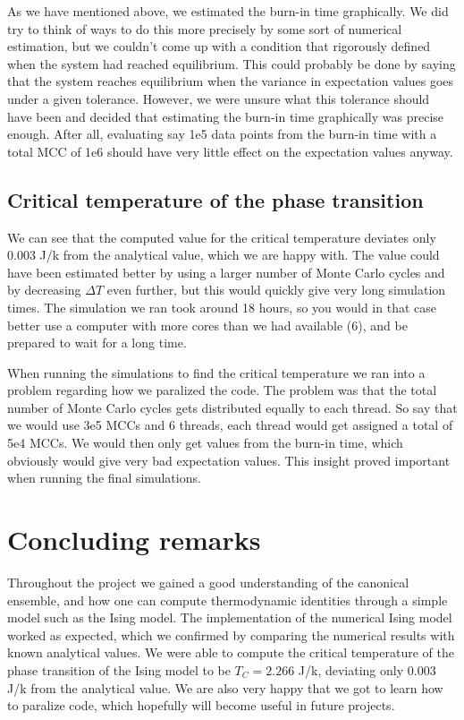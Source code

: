 \documentclass{article}
\begin{document}
\begin{multicols}{2}
As we have mentioned above, we estimated the burn-in time graphically. We did try to think of ways to do this more precisely by some sort of numerical estimation, but we couldn't come up with a condition that rigorously defined when the system had reached equilibrium. This could probably be done by saying that the system reaches equilibrium when the variance in expectation values goes under a given tolerance. However, we were unsure what this tolerance should have been and decided that estimating the burn-in time graphically was precise enough. After all, evaluating say 1e5 data points from the burn-in time with a total MCC of 1e6 should have very little effect on the expectation values anyway.

\subsection{Critical temperature of the phase transition}
We can see that the computed value for the critical temperature deviates only 0.003 J/k from the analytical value, which we are happy with. The value could have been estimated better by using a larger number of Monte Carlo cycles and by decreasing $\Delta T$ even further, but this would quickly give very long simulation times. The simulation we ran took around 18 hours, so you would in that case better use a computer with more cores than we had available (6), and be prepared to wait for a long time. 

When running the simulations to find the critical temperature we ran into a problem regarding how we paralized the code. The problem was that the total number of Monte Carlo cycles gets distributed equally to each thread. So say that we would use 3e5 MCCs and 6 threads, each thread would get assigned a total of 5e4 MCCs. We would then only get values from the burn-in time, which obviously would give very bad expectation values. This insight proved important when running the final simulations. 

\section{Concluding remarks}

Throughout the project we gained a good understanding of the canonical ensemble, and how one can compute thermodynamic identities through a simple model such as the Ising model. The implementation of the numerical Ising model worked as expected, which we confirmed by comparing the numerical results with known analytical values. We were able to compute the critical temperature of the phase transition of the Ising model to be $T_C=2.266$ J/k, deviating only $0.003$ J/k from the analytical value. We are also very happy that we got to learn how to paralize code, which hopefully will become useful in future projects. 


\end{multicols}
\end{document}
